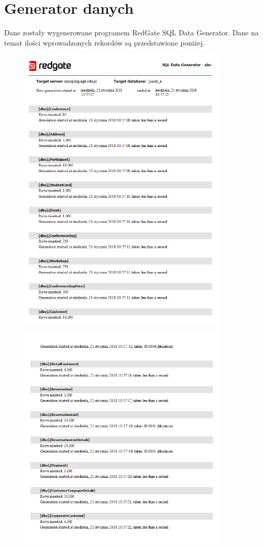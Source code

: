 \documentclass[]{article}
\begin{document}
\section{Generator danych}
Dane zostały wygenerowane programem RedGate SQL Data Generator. Dane na temat ilości wprowadzonych rekordów są przedstawione poniżej.
\begin{figure}[H]
	\centering
	\includegraphics[width=0.9\textwidth]{redgate1}
\end{figure}
\begin{figure}[H]
	\centering
	\includegraphics[width=0.9\textwidth]{redgate2}
\end{figure}
\end{document}
